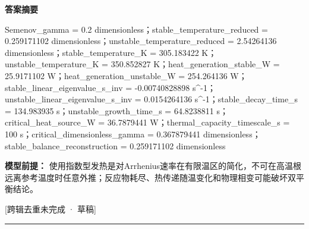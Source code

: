 \documentclass[UTF8,11pt,a4paper]{ctexart}
\begin{document}
\noindent\textbf{答案摘要}\par
Semenov\_gamma = 0.2 dimensionless；stable\_temperature\_reduced = 0.259171102 dimensionless；unstable\_temperature\_reduced = 2.54264136 dimensionless；stable\_temperature\_K = 305.183422 K；unstable\_temperature\_K = 350.852827 K；heat\_generation\_stable\_W = 25.9171102 W；heat\_generation\_unstable\_W = 254.264136 W；stable\_linear\_eigenvalue\_s\_inv = -0.00740828898 s\textasciicircum{}-1；unstable\_linear\_eigenvalue\_s\_inv = 0.0154264136 s\textasciicircum{}-1；stable\_decay\_time\_s = 134.983935 s；unstable\_growth\_time\_s = 64.8238811 s；critical\_heat\_source\_W = 36.7879441 W；thermal\_capacity\_timescale\_s = 100 s；critical\_dimensionless\_gamma = 0.367879441 dimensionless；stable\_balance\_reconstruction = 0.259171102 dimensionless\par
\noindent\textbf{模型前提：}
使用指数型发热是对Arrhenius速率在有限温区的简化，不可在高温根远离参考温度时任意外推；反应物耗尽、热传递随温变化和物理相变可能破坏双平衡结论。\par
\noindent\textcolor{red!65!black}{[跨辑去重未完成 · 草稿]} \par
\medskip\hrule\medskip
{}
\end{document}

